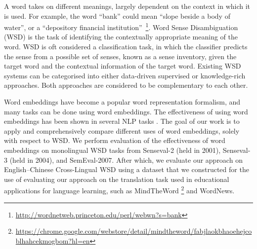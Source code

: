 A word takes on different meanings, largely dependent on the context
in which it is used. For example, the word ``bank'' could mean ``slope
beside a body of water'', or a ``depository financial
institution''~\footnote{\url{http://wordnetweb.princeton.edu/perl/webwn?s=bank}}. Word
Sense Disambiguation (WSD) is the task of identifying the contextually
appropriate meaning of the word. WSD is oft considered a
classification task, in which the classifier predicts the sense from a
possible set of senses, known as a sense inventory, given the target
word and the contextual information of the target word. Existing WSD
systems can be categorised into either data-driven supervised or
knowledge-rich approaches. Both approaches are considered to be
complementary to each other.

Word embeddings have become a popular word representation formalism,
and many tasks can be done using word embeddings. The effectiveness of
using word embeddings has been shown in
several NLP tasks \cite{Turian10wordrepresentations}. The goal of our
work is to apply and comprehensively compare different uses of word
embeddings, solely with respect to WSD. We perform evaluation of the
effectiveness of word embeddings on monolingual WSD tasks from
Senseval-2 (held in 2001), Senseval-3 (held in 2004), and
SemEval-2007. After which, we evaluate our approach on English--Chinese
Cross-Lingual WSD using a dataset that we constructed for the use of
evaluating our approach on the translation task used in educational
applications for language learning, such as MindTheWord
{\footnote{\url{https://chrome.google.com/webstore/detail/mindtheword/fabjlaokbhaoehejcoblhahcekmogbom?hl=en}}}
and WordNews.


